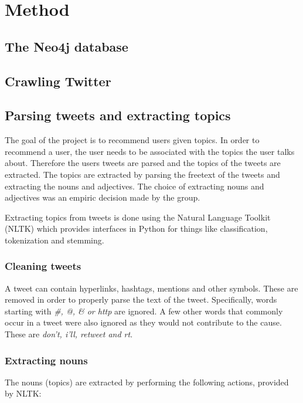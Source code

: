\section{Method}
\label{sec:method}

\subsection{The Neo4j database}

\subsection{Crawling Twitter}

\subsection{Parsing tweets and extracting topics}

The goal of the project is to recommend users given topics. In order to
recommend a user, the user needs to be associated with the topics the user talks
about. Therefore the users tweets are parsed and the topics of the tweets are
extracted.  The topics are extracted by parsing the freetext of the tweets and
extracting the nouns and adjectives.  The choice of extracting nouns and
adjectives was an empiric decision made by the group.

Extracting topics from tweets is done using the Natural Language Toolkit (NLTK)
\cite{bird2006nltk} which provides interfaces in Python for things like
classification, tokenization and stemming.

\subsubsection{Cleaning tweets}

A tweet can contain hyperlinks, hashtags, mentions and other symbols. These are
removed in order to properly parse the text of the tweet. Specifically, words
starting with \textit{\#, @, \& or http} are ignored. A few other words that
commonly occur in a tweet were also ignored as they would not contribute to the
cause. These are \textit{don't, i'll, retweet and rt}.

\subsubsection{Extracting nouns}

The nouns (topics) are extracted by performing the following actions, provided
by NLTK:

